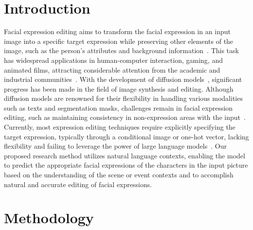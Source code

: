 \section{Introduction}

\vspace{-2mm}

Facial expression editing aims to transform the facial expression in an input image into a specific target expression while preserving other elements of the image, such as the person's attributes and background information~\cite{ding2017exprgan}. This task has widespread applications in human-computer interaction, gaming, and animated films, attracting considerable attention from the academic and industrial communities~\cite{melnik2024face}. With the development of diffusion models~\cite{dhariwal2021diffusion, ho2020denoising, sohldickstein2015deep}, significant progress has been made in the field of image synthesis and editing. Although diffusion models are renowned for their flexibility in handling various modalities such as texts and segmentation masks, challenges remain in facial expression editing, such as maintaining consistency in non-expression areas with the input~\cite{ling2020toward}. Currently, most expression editing techniques require explicitly specifying the target expression, typically through a conditional image or one-hot vector, lacking flexibility and failing to leverage the power of large language models~\cite{ling2020toward,ding2017exprgan,li2023reganie}. Our proposed research method utilizes natural language contexts, enabling the model to predict the appropriate facial expressions of the characters in the input picture based on the understanding of the scene or event contexts and to accomplish natural and accurate editing of facial expressions.
\vspace{-2mm}

\section{Methodology}

\vspace{-2mm}

